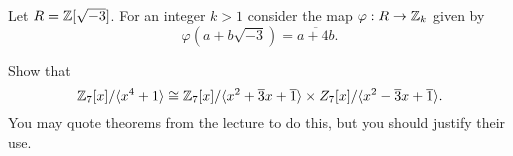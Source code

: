 \question
Let $R = \mathbb{Z}[\sqrt{-3}]$.
For an integer $k > 1$ consider the map $\varphi: R \to \mathbb{Z}_k$
given by
\[
    \varphi(a+b\sqrt{-3}) = \overline{a + 4b}.
\]

\question
Show that
\[
    \mathbb{Z}_7[x] / \langle x^4 + 1 \rangle \cong
    \mathbb{Z}_7[x] / \langle x^2 + \overline3 x + \overline 1 \rangle
        \times Z_7[x] / \langle x^2 - \overline3 x + \overline 1 \rangle.
\]
You may quote theorems from the lecture to do this, but you should justify their use.

